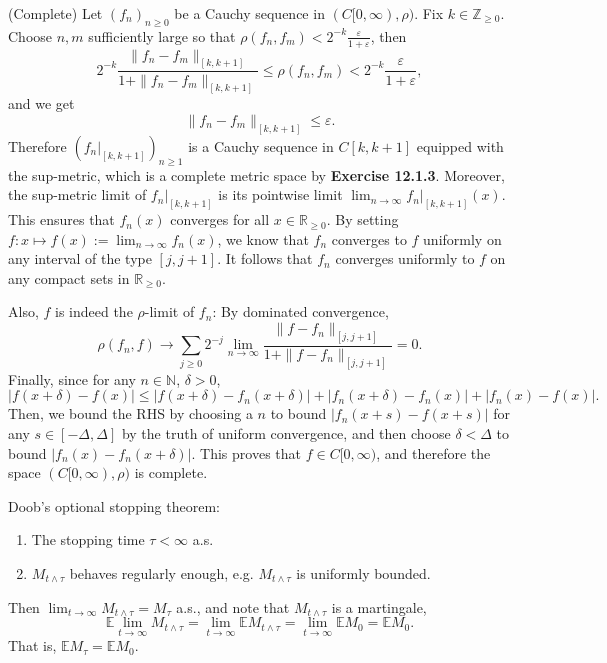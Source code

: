 \documentclass[12pt]{extarticle}
\begin{document}
(Complete)
Let $(f_n)_{n\geq 0}$ be a Cauchy sequence in $(C[0,\infty),\rho)$.
Fix $k\in\mathbb{Z}_{\geq 0}$.
Choose $n,m$ sufficiently large so that $\rho(f_n,f_m)<2^{-k}\frac{\varepsilon}{1+\varepsilon}$, then
\[
2^{-k}\frac{\|f_n-f_m\|_{[k,k+1]}}{1+\|f_n-f_m\|_{[k,k+1]}}
\leq
\rho	(f_n,f_m)<2^{-k}\frac{\varepsilon}{1+\varepsilon},
\]
and we get
\[
\|f_n-f_m\|_{[k,k+1]}\leq\varepsilon.
\]
Therefore $(f_n|_{[k,k+1]})_{n\geq 1}$ is a Cauchy sequence in $C[k,k+1]$ equipped with the sup-metric, which is a complete metric space by {\bf Exercise 12.1.3}.
Moreover, the sup-metric limit of $f_n|_{[k,k+1]}$ is its pointwise limit $\lim_{n\rightarrow\infty}f_n|_{[k,k+1]}(x)$.
This ensures that $f_n(x)$ converges for all $x\in\mathbb{R}_{\geq 0}$. By setting $f:x\mapsto f(x):=\lim_{n\rightarrow\infty}f_n(x)$, we know that $f_n$ converges to $f$ uniformly on any interval of the type $[j,j+1]$.
It follows that $f_n$ converges uniformly to $f$ on any compact sets in $\mathbb{R}_{\geq 0}$.

Also, $f$ is indeed the $\rho$-limit of $f_n$: By dominated convergence,
\[
\rho(f_n,f)\rightarrow\sum_{j\geq 0}2^{-j}\lim_{n\rightarrow\infty}\frac{\|f-f_n\|_{[j,j+1]}}{1+\|f-f_n\|_{[j,j+1]}}=0.
\]
Finally, since for any $n\in\mathbb{N}$, $\delta>0$,
\[
|f(x+\delta)-f(x)|\leq|f(x+\delta)-f_n(x+\delta)|+|f_n(x+\delta)-f_n(x)|+|f_n(x)-f(x)|.
\]
Then, we bound the RHS by choosing a $n$ to bound $|f_n(x+s)-f(x+s)|$ for any $s\in[-\Delta,\Delta]$ by the truth of uniform convergence, and then choose $\delta<\Delta$ to bound $|f_n(x)-f_n(x+\delta)|$.
This proves that $f\in C[0,\infty)$, and therefore the space $(C[0,\infty),\rho)$ is complete.


\newpage
\noindent
Doob's optional stopping theorem:
\begin{enumerate}
\item The stopping time $\tau<\infty$ a.s.
\item $M_{t\wedge\tau}$ behaves regularly enough, e.g. $M_{t\wedge\tau}$ is uniformly bounded.
\end{enumerate}
Then $\lim_{t\rightarrow\infty}M_{t\wedge\tau}=M_\tau$ a.s., and note that $M_{t\wedge\tau}$ is a martingale,
\[
\mathbb{E}\lim_{t\rightarrow\infty}M_{t\wedge\tau}=\lim_{t\rightarrow\infty}\mathbb{E}M_{t\wedge\tau}=\lim_{t\rightarrow\infty}\mathbb{E}M_0=\mathbb{E}M_0.
\]
That is, $\mathbb{E}M_\tau=\mathbb{E}M_0$.
\end{document}
